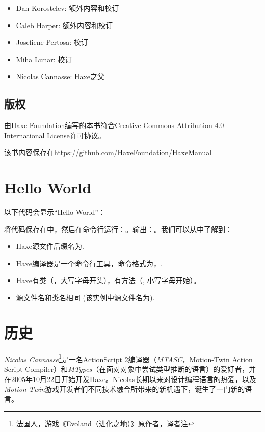 \begin{itemize}
	\item Dan Korostelev: 额外内容和校订
	\item Caleb Harper: 额外内容和校订
	\item Josefiene Pertosa: 校订
	\item Miha Lunar: 校订
	\item Nicolas Cannasse: Haxe之父
\end{itemize}

\subsection{版权}
\label{introduction-license}

由\href{http://haxe.org/foundation}{Haxe Foundation}编写的本书符合\href{http://creativecommons.org/licenses/by/4.0/}{Creative Commons Attribution 4.0 International License}许可协议。

该书内容保存在\href{https://github.com/HaxeFoundation/HaxeManual}{https://github.com/HaxeFoundation/HaxeManual}

\section{Hello World}
\label{introduction-hello-world}

以下代码会显示``Hello World''：

将代码保存在中，然后在命令行运行：。输出：。我们可以从中了解到：


\begin{itemize}
	\item Haxe源文件后缀名为.
	\item Haxe编译器是一个命令行工具，命令格式为，.
	\item Haxe有类（，大写字母开头），有方法（, 小写字母开始）。
	\item 源文件名和类名相同 (该实例中源文件名为). 
\end {itemize}
 
\section{历史 }
\label{introduction-haxe-history}

\emph{Nicolas Cannasse}\footnote{法国人，游戏《Evoland（进化之地）》原作者，译者注}是一名ActionScript 2编译器（\emph{MTASC}，Motion-Twin Action Script Compiler）和\emph{MTypes}（在面对对象中尝试类型推断的语言）的爱好者，并在2005年10月22日开始开发Haxe。Nicolas长期以来对设计编程语言的热爱，以及\emph{Motion-Twin}游戏开发者们不同技术融合所带来的新机遇下，诞生了一门新的语言。

